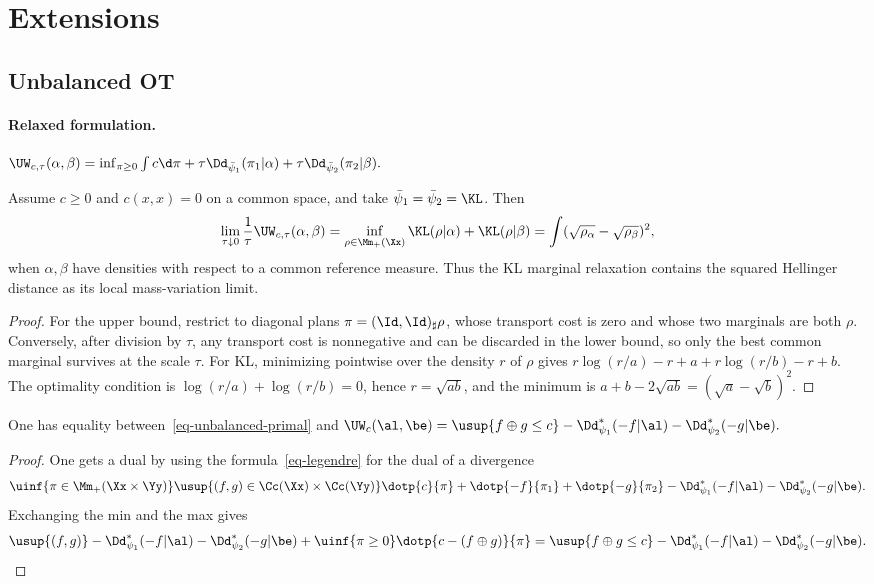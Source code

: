 \section{Extensions}
\label{sec-extensions}
\subsection{Unbalanced OT}
\label{sec-unbalanced}
\paragraph{Relaxed formulation.}
\(\UW_{c,\tau}(\alpha,\beta) = \inf_{\pi\geq0} \int c\d\pi + \tau\Dd_{\bar\psi_1}(\pi_1|\alpha) + \tau\Dd_{\bar\psi_2}(\pi_2|\beta).\)
\begin{prop}\label{prop-unbalanced-kl-hellinger}
Assume $c\geq0$ and $c(x,x)=0$ on a common space, and take $\bar\psi_1=\bar\psi_2=\KL$. Then
\[
\lim_{\tau\downarrow0}\frac{1}{\tau}\UW_{c,\tau}(\alpha,\beta)
=
\inf_{\rho\in\Mm_+(\Xx)} \KL(\rho|\alpha)+\KL(\rho|\beta)
=
\int(\sqrt{\rho_\alpha}-\sqrt{\rho_\beta})^2,
\]
when $\alpha,\beta$ have densities with respect to a common reference measure. Thus the KL marginal relaxation contains the squared Hellinger distance as its local mass-variation limit.
\end{prop}
\begin{proof}
For the upper bound, restrict to diagonal plans $\pi=(\Id,\Id)_\sharp\rho$, whose transport cost is zero and whose two marginals are both $\rho$. Conversely, after division by $\tau$, any transport cost is nonnegative and can be discarded in the lower bound, so only the best common marginal survives at the scale $\tau$. For KL, minimizing pointwise over the density $r$ of $\rho$ gives
\(r\log(r/a)-r+a+r\log(r/b)-r+b.\)
The optimality condition is $\log(r/a)+\log(r/b)=0$, hence $r=\sqrt{ab}$, and the minimum is $a+b-2\sqrt{ab}=(\sqrt a-\sqrt b)^2$.
\end{proof}
\begin{prop}
One has equality between~\eqref{eq-unbalanced-primal} and
\(\UW_c(\al,\be)=\usup{f \oplus g \leq c} - \Dd_{\psi_1}^*(-f|\al) - \Dd_{\psi_2}^*(-g|\be).\)
\end{prop}
\begin{proof}
One gets a dual by using the formula~\eqref{eq-legendre} for the dual of a divergence
\begin{align*}
\uinf{\pi \in \Mm_+(\Xx \times \Yy)} \usup{(f,g) \in \Cc(\Xx) \times \Cc(\Yy)}
\dotp{c}{\pi} + \dotp{-f}{\pi_1} + \dotp{-g}{\pi_2} - \Dd_{\psi_1}^*(-f|\al) - \Dd_{\psi_2}^*(-g|\be).
\end{align*}
Exchanging the min and the max gives
\[
\usup{(f,g)}
-\Dd_{\psi_1}^*(-f|\al)-\Dd_{\psi_2}^*(-g|\be)
+\uinf{\pi\geq0}\dotp{c-(f\oplus g)}{\pi}
=
\usup{f\oplus g\leq c}
-\Dd_{\psi_1}^*(-f|\al)-\Dd_{\psi_2}^*(-g|\be).
\]
\end{proof}
